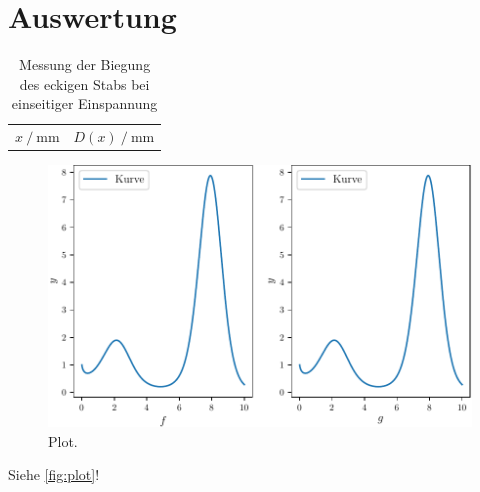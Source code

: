 \section{Auswertung}
\label{sec:Auswertung}

\begin{table}
  \centering
  \caption{Messung der Biegung des eckigen Stabs bei einseitiger Einspannung}
  \label{tab:ecks}
  \begin{tabular}{S[table-format=4.0] S[table-Sformat=4.0]}
    \toprule
    {$x \mathbin{/} \si{\milli\meter}$} & {$D(x) \mathbin{/} \si{\milli\meter}$}
  \end{tabular}
\end{table}

\begin{figure}
  \centering
  \includegraphics{plot.pdf}
  \caption{Plot.}
  \label{fig:plot}
\end{figure}


Siehe \autoref{fig:plot}!
